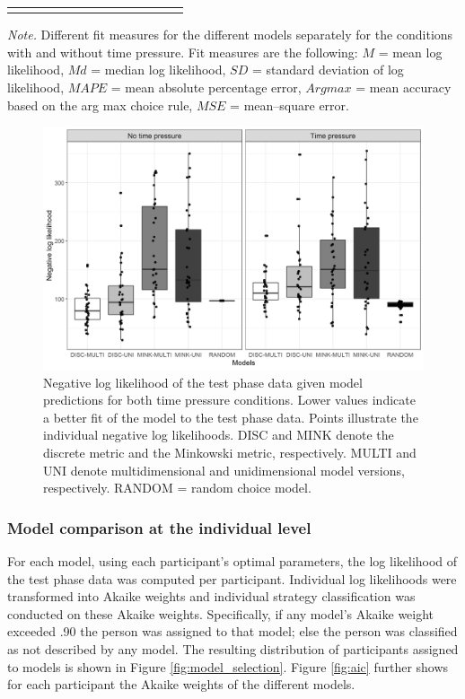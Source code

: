 \documentclass[a4paper,man,natbib]{apa6}
\begin{document}
\begin{table}
\begin{center}
\begin{threeparttable}
\begin{tabular}{llcccccccccccc}
\bottomrule
\addlinespace
\end{tabular}
\begin{tablenotes}[para]
\textit{Note.} Different fit measures for the different models separately for the conditions with and without time pressure. 
          Fit measures are the following: $M$ = mean log likelihood, $Md$ = median log likelihood, $SD$ = standard deviation of log likelihood, $MAPE$ = mean absolute percentage error, $Arg max$ = mean accuracy based on the arg max choice rule, $MSE$ = mean--square error.
\end{tablenotes}
\end{threeparttable}
\end{center}
\end{table}

\begin{figure}[htbp]
\centering
\includegraphics[width = \textwidth]{fig_log_lik.png}
\caption{Negative log likelihood of the test phase data given model predictions for both time pressure conditions. Lower values indicate a better fit of the model to the test phase data. Points illustrate the individual negative log likelihoods. DISC and MINK denote the discrete metric and the Minkowski metric, respectively. MULTI and UNI denote multidimensional and unidimensional model versions, respectively. RANDOM = random choice model.}
\label{fig:log_lik}
\end{figure}

\subsubsection{Model comparison at the individual level} \label{sec:res_ind}
For each model, using each participant's optimal parameters, the log likelihood of the test phase data was computed per participant. Individual log likelihoods were transformed into Akaike weights \citep{wagenmakers2004aic} and individual strategy classification was conducted on these Akaike weights. Specifically, if any model’s Akaike weight exceeded .90 the person was assigned to that model; else the person was classified as not described by any model. The resulting distribution of participants assigned to models is shown in Figure \ref{fig:model_selection}. Figure \ref{fig:aic} further shows for each participant the Akaike weights of the different models.
\end{document}
